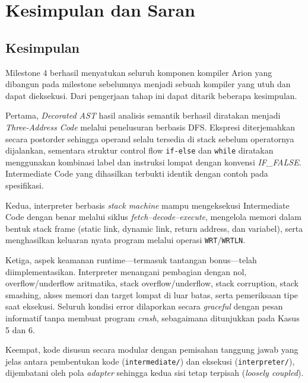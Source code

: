 \section{Kesimpulan dan Saran}

\subsection{Kesimpulan}

Milestone 4 berhasil menyatukan seluruh komponen kompiler Arion yang dibangun pada
milestone sebelumnya menjadi sebuah kompiler yang utuh dan dapat dieksekusi. Dari
pengerjaan tahap ini dapat ditarik beberapa kesimpulan.

Pertama, \emph{Decorated AST} hasil analisis semantik berhasil diratakan menjadi
\emph{Three-Address Code} melalui penelusuran berbasis DFS. Ekspresi diterjemahkan
secara postorder sehingga operand selalu tersedia di stack sebelum operatornya
dijalankan, sementara struktur control flow \texttt{if-else} dan \texttt{while}
diratakan menggunakan kombinasi label dan instruksi lompat dengan konvensi
\emph{IF\_FALSE}. Intermediate Code yang dihasilkan terbukti identik dengan contoh
pada spesifikasi.

Kedua, interpreter berbasis \emph{stack machine} mampu mengeksekusi Intermediate
Code dengan benar melalui siklus \emph{fetch--decode--execute}, mengelola memori
dalam bentuk stack frame (static link, dynamic link, return address, dan variabel),
serta menghasilkan keluaran nyata program melalui operasi \texttt{WRT}/\texttt{WRTLN}.

Ketiga, aspek keamanan runtime---termasuk tantangan bonus---telah
diimplementasikan. Interpreter menangani pembagian dengan nol, overflow/underflow
aritmatika, stack overflow/underflow, stack corruption, stack smashing, akses
memori dan target lompat di luar batas, serta pemeriksaan tipe saat eksekusi.
Seluruh kondisi error dilaporkan secara \emph{graceful} dengan pesan informatif
tanpa membuat program \emph{crash}, sebagaimana ditunjukkan pada Kasus 5 dan 6.

Keempat, kode disusun secara modular dengan pemisahan tanggung jawab yang jelas
antara pembentukan kode (\texttt{intermediate/}) dan eksekusi
(\texttt{interpreter/}), dijembatani oleh pola \emph{adapter} sehingga kedua sisi
tetap terpisah (\emph{loosely coupled}).

